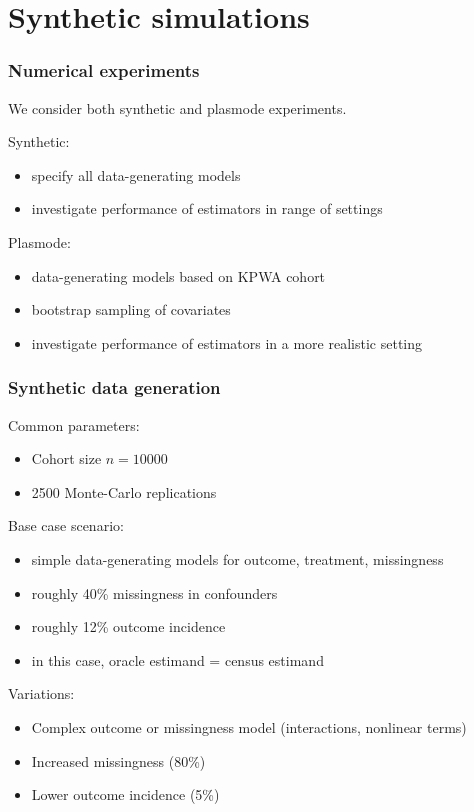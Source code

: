 \documentclass[10pt, table]{beamer}
\begin{document}
\section{Synthetic simulations}

\begin{frame} \frametitle{Numerical experiments}

We consider both synthetic and plasmode experiments.

Synthetic:\vspace{-0.4cm}
\begin{itemize}
  \item specify all data-generating models
  \item investigate performance of estimators in range of settings
\end{itemize}

Plasmode:\vspace{-0.4cm}
\begin{itemize}
  \item data-generating models based on KPWA cohort
  \item bootstrap sampling of covariates
  \item investigate performance of estimators in a more realistic setting
\end{itemize}

\end{frame}

\begin{frame} \frametitle{Synthetic data generation}
Common parameters:\vspace{-0.4cm}
\begin{itemize}
  \item Cohort size $n = 10000$
  \item 2500 Monte-Carlo replications
\end{itemize}

Base case scenario: \vspace{-0.4cm}
\begin{itemize}
  \item simple data-generating models for outcome, treatment, missingness
  \item roughly 40\% missingness in confounders
  \item roughly 12\% outcome incidence
  \item in this case, oracle estimand = census estimand
\end{itemize}

Variations:\vspace{-0.4cm}
\begin{itemize}
  \item Complex outcome or missingness model (interactions, nonlinear terms)
  \item Increased missingness (80\%)
  \item Lower outcome incidence (5\%)
\end{itemize}
\end{frame}
\end{document}
